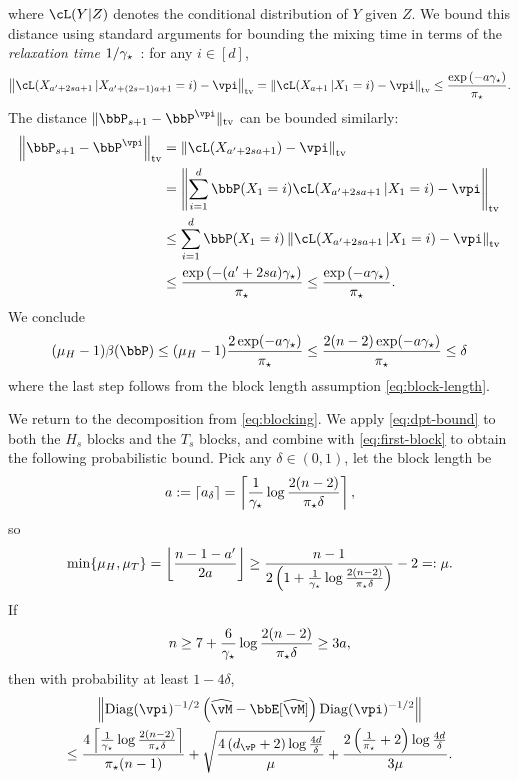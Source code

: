 where $\cL(Y|Z)$ denotes the conditional distribution of $Y$ given
$Z$.
We bound this distance using standard arguments for bounding the
mixing time in terms of the \emph{relaxation time}
$1/\gamma_{\star}$~\citep[see, e.g., the proof of Theorem 12.3 of][]{LePeWi08}:
for any $i \in [d]$,
\[
  \Norm{
    \cL(X_{a'+2sa+1}\,|X_{a'+(2s-1)a+1}=i)
    - \vpi
  }_{\tv}
  =
  \Norm{
    \cL(X_{a+1}\,|X_1=i)
    - \vpi
  }_{\tv}
  \leq
  \frac{
    \exp\Parens{ -a\gap }
  }{\pimin}
  .
\]
The distance $\norm{ \bbP_{s+1} - \bbP^{\vpi} }_{\tv}$ can be bounded
similarly:
\begin{align*}
  \Norm{
    \bbP_{s+1}
    - \bbP^{\vpi}
  }_{\tv}
  & =
  \Norm{
    \cL(X_{a'+2sa+1})
    - \vpi
  }_{\tv}
  \\
  & =
  \Norm{
    \sum_{i=1}^d \bbP(X_1 = i)
    \cL(X_{a'+2sa+1}\,|X_1 = i)
    - \vpi
  }_{\tv}
  \\
  & \leq
  \sum_{i=1}^d \bbP(X_1 = i)
  \Norm{
    \cL(X_{a'+2sa+1}\,|X_1 = i)
    - \vpi
  }_{\tv}
  \\
  & \leq
  \frac{
    \exp\Parens{-(a'+2sa)\gap}
  }{\pimin}
  \leq
  \frac{
    \exp\Parens{-a\gap}
  }{\pimin}
  .
\end{align*}
We conclude
\[
  (\mu_H-1)\beta(\bbP)
  \leq (\mu_H-1)\frac{2\exp(-a\gap)}{\pimin}
  \leq \frac{2(n-2)\exp(-a\gap)}{\pimin}
  \leq \delta
\]
where the last step follows from the block length assumption
\cref{eq:block-length}.


We return to the decomposition from \cref{eq:blocking}.
We apply \cref{eq:dpt-bound} to both the $H_s$ blocks and the $T_s$
blocks, and combine with \cref{eq:first-block} to obtain the following
probabilistic bound.
Pick any $\delta \in (0,1)$, let the block length be
\[
  a
  := \lceil a_\delta \rceil
  =
  \left\lceil
    \frac{1}{\gamma_{\star}}\log\frac{2(n-2)}{\pi_{\star}\delta}
  \right\rceil
  ,
\]
so
\[
  \min\{\mu_H,\mu_T\}
  =
  \left\lfloor
    \frac{n-1-a'}{2a}
  \right\rfloor
  \geq
  \frac{n-1}
  {
    2\left(
      1 + \frac1{\gamma_{\star}}\log\frac{2(n-2)}{\pi_{\star}\delta}
    \right)
  }
  -2
  =: \mu
  .
\]
If
\begin{equation}
  n \geq 7 + \frac6{\gamma_{\star}} \log \frac{2(n-2)}{\pi_{\star}\delta}
  \geq 3a
  ,
  \label{eq:min-n2}
\end{equation}
then with probability at least $1-4\delta$,
\begin{multline*}
  \Norm{\Diag(\vpi)^{-1/2}\Parens{\wh\vM - \bbE[\wh\vM]} \Diag(\vpi)^{-1/2} }
  \\
  \leq
  \frac{4
    \Ceil{
      \frac{1}{\gap}\log\frac{2(n-2)}{\pimin\delta}
    }
  }{\pimin(n-1)}
  +
  \sqrt{
    \frac{4\Parens{ d_{\vP} + 2 } \log\frac{4d}{\delta}}
    {\mu}
  }
  + \frac{2\Parens{ \frac1{\pimin} + 2 } \log\frac{4d}{\delta}}
  {3\mu}
  .
\end{multline*}


